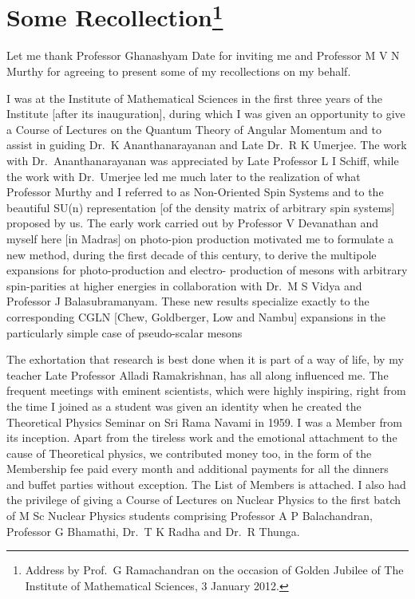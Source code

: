 \chapter[Some Recollection]{Some Recollection\footnote[*]{Address by Prof.\ G Ramachandran on the occasion of Golden Jubilee of The Institute of Mathematical Sciences, 3 January 2012.}}\label{chap2}


Let me thank Professor Ghanashyam Date for inviting me and Professor M V N Murthy
for agreeing to present some of my recollections on my behalf.

I was at the Institute of Mathematical Sciences in the first three years of the
Institute [after its inauguration], during which I was given an opportunity to give
a Course of Lectures on the Quantum Theory of Angular Momentum and to assist
in guiding Dr.\ K Ananthanarayanan and Late Dr.\ R K Umerjee. The work with Dr.\ 
Ananthanarayanan was appreciated by Late Professor L I Schiff, while the work with
Dr.\ Umerjee led me much later to the realization of what Professor Murthy and I
referred to as Non-Oriented Spin Systems and to the beautiful SU(n) representation
[of the density matrix of arbitrary spin systems] proposed by us. The early work
carried out by Professor V Devanathan and myself here [in Madras] on photo-pion
production motivated me to formulate a new method, during the first decade of
this century, to derive the multipole expansions for photo-production and electro-
production of mesons with arbitrary spin-parities at higher energies in collaboration
with Dr.\ M S Vidya and Professor J Balasubramanyam. These new results specialize
exactly to the corresponding CGLN [Chew, Goldberger, Low and Nambu] expansions
in the particularly simple case of pseudo-scalar mesons

The exhortation that research is best done when it is part of a way of life, by
my teacher Late Professor Alladi Ramakrishnan, has all along influenced me. The
frequent meetings with eminent scientists, which were highly inspiring, right from
the time I joined as a student was given an identity when he created the Theoretical
Physics Seminar on Sri Rama Navami in 1959. I was a Member from its inception.
Apart from the tireless work and the emotional attachment to the cause of\break 
Theoretical physics, we contributed money too, in the form of the Membership fee paid every
month and additional payments for all the dinners and buffet parties without exception. 
The List of Members is attached. I also had the privilege of giving a Course
of Lectures on Nuclear Physics to the first batch of M Sc Nuclear Physics students
comprising Professor A P Balachandran, Professor G Bhamathi, Dr.\ T K Radha and
Dr.\ R Thunga.

